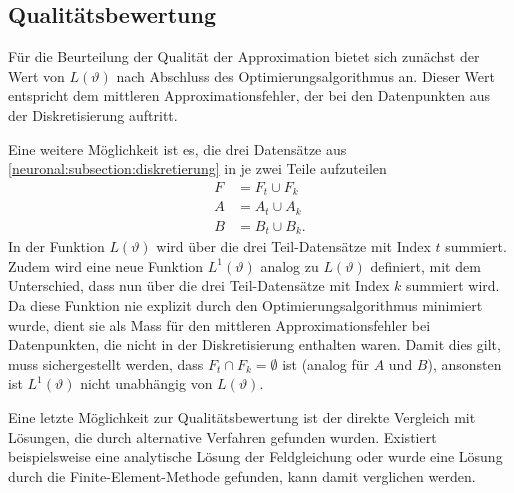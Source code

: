 \subsection{Qualitätsbewertung}\label{neuronal:subsection:qualitätsbewertung}
%
Für die Beurteilung der Qualität der Approximation bietet sich zunächst der Wert von \( L(\vartheta) \) nach Abschluss des Optimierungsalgorithmus an.
Dieser Wert entspricht dem mittleren Approximationsfehler, der bei den Datenpunkten aus der Diskretisierung auftritt.

Eine weitere Möglichkeit ist es, die drei Datensätze aus \ref{neuronal:subsection:diskretierung} in je zwei Teile aufzuteilen
\begin{equation*}
    \begin{aligned}
        F &= F_t \cup F_k\\
        A &= A_t \cup A_k\\
        B &= B_t \cup B_k.
    \end{aligned}
\end{equation*}
In der Funktion $L(\vartheta)$ wird über die drei Teil-Datensätze mit Index $t$ summiert.
Zudem wird eine neue Funktion \( L^1(\vartheta) \) analog zu $L(\vartheta)$ definiert, mit dem Unterschied, dass nun über die drei Teil-Datensätze mit Index $k$ summiert wird.
Da diese Funktion nie explizit durch den Optimierungsalgorithmus minimiert wurde, dient sie als Mass für den mittleren Approximationsfehler bei Datenpunkten, die nicht in der Diskretisierung enthalten waren.
Damit dies gilt, muss sichergestellt werden, dass $F_t \cap F_k = \emptyset$ ist (analog für $A$ und $B$), ansonsten ist $L^1(\vartheta)$ nicht unabhängig von $L(\vartheta)$.

Eine letzte Möglichkeit zur Qualitätsbewertung ist der direkte Vergleich mit Lösungen, die durch alternative Verfahren gefunden wurden.
Existiert beispielsweise eine analytische Lösung der Feldgleichung oder wurde eine Lösung durch die Finite-Element-Methode gefunden, kann damit verglichen werden.
%

